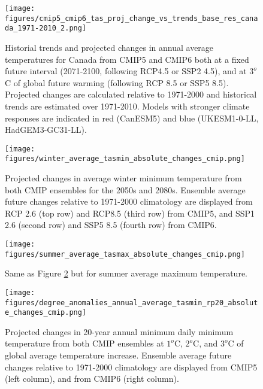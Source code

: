\documentclass[]{scrartcl}
\begin{document}
\begin{figure}[ht!]
	\centering
	\texttt{[image: figures/cmip5\_cmip6\_tas\_proj\_change\_vs\_trends\_base\_res\_canada\_1971-2010\_2.png]}
	\caption[Tas]{Historial trends and projected changes in annual average temperatures for Canada from CMIP5 and CMIP6 both at a fixed future interval (2071-2100, following RCP4.5 or SSP2 4.5), and at $3^o$C of global future warming (following RCP 8.5 or SSP5 8.5). Projected changes are calculated relative to 1971-2000 and historical trends are estimated over 1971-2010. Models with stronger climate responses are indicated in red (CanESM5) and blue (UKESM1-0-LL, HadGEM3-GC31-LL).}
	\label{fig:tas_scatter}
\end{figure}




\begin{figure}[ht!]
	\centering
	\texttt{[image: figures/winter\_average\_tasmin\_absolute\_changes\_cmip.png]}
	\caption[Pr]{Projected changes in average winter minimum temperature from both CMIP ensembles for the 2050s and 2080s. Ensemble average future changes relative to 1971-2000 climatology are displayed from RCP 2.6 (top row) and RCP8.5 (third row) from CMIP5, and SSP1 2.6 (second row) and SSP5 8.5 (fourth row) from CMIP6.}
	\label{fig:win_tasmin_future}
\end{figure}


\begin{figure}[ht!]
	\centering
	\texttt{[image: figures/summer\_average\_tasmax\_absolute\_changes\_cmip.png]}
	\caption[Pr]{Same as Figure \ref{fig:win_tasmin_future} but for summer average maximum temperature.}
	\label{fig:sum_tasmax_future}
\end{figure}


\begin{figure}[ht!]
	\centering
	\texttt{[image: figures/degree\_anomalies\_annual\_average\_tasmin\_rp20\_absolute\_changes\_cmip.png]}
	\caption[Tas]{Projected changes in 20-year annual minimum daily minimum temperature from both CMIP ensembles at $1^o$C, $2^o$C, and $3^o$C of global average temperature increase. Ensemble average future changes relative to 1971-2000 climatology are displayed from CMIP5 (left column), and from CMIP6 (right column).}
	\label{fig:ext_tasmin_deg_anoms}
\end{figure}
\end{document}
